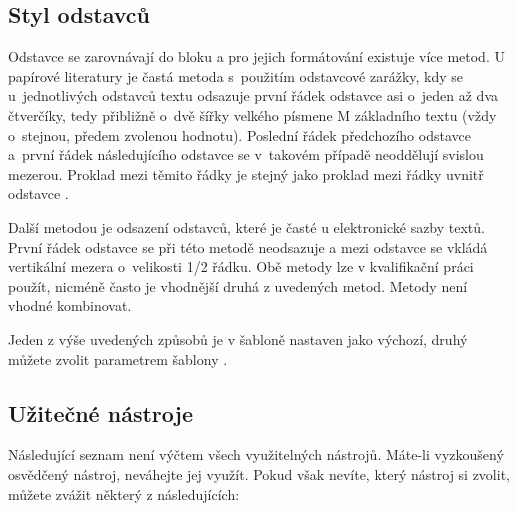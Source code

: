 \subsection*{Styl odstavců}

Odstavce se zarovnávají do bloku a pro jejich formátování existuje více metod. U papírové literatury je častá metoda s~použitím odstavcové zarážky, kdy se u~jednotlivých odstavců textu odsazuje první řádek odstavce asi o~jeden až dva čtverčíky, tedy přibližně o~dvě šířky velkého písmene M základního textu (vždy o~stejnou, předem zvolenou hodnotu). Poslední řádek předchozího odstavce a~první řádek následujícího odstavce se v~takovém případě neoddělují svislou mezerou. Proklad mezi těmito řádky je stejný jako proklad mezi řádky uvnitř odstavce \cite{fitWeb}.

Další metodou je odsazení odstavců, které je časté u elektronické sazby textů. První řádek odstavce se při této metodě neodsazuje a mezi odstavce se vkládá vertikální mezera o~velikosti 1/2 řádku. Obě metody lze v kvalifikační práci použít, nicméně často je vhodnější druhá z uvedených metod. Metody není vhodné kombinovat.

Jeden z výše uvedených způsobů je v šabloně nastaven jako výchozí, druhý můžete zvolit parametrem šablony .

\subsection*{Užitečné nástroje}
\label{nastroje}

Následující seznam není výčtem všech využitelných nástrojů. Máte-li vyzkoušený osvědčený nástroj, neváhejte jej využít. Pokud však nevíte, který nástroj si zvolit, můžete zvážit některý z následujících:

